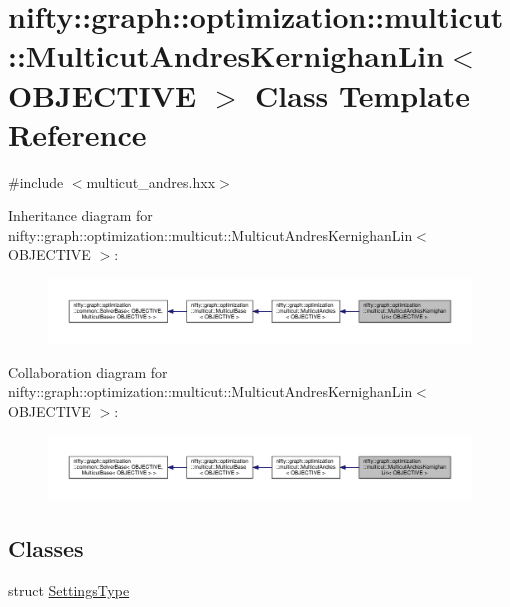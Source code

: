 \hypertarget{classnifty_1_1graph_1_1optimization_1_1multicut_1_1MulticutAndresKernighanLin}{}\section{nifty\+:\+:graph\+:\+:optimization\+:\+:multicut\+:\+:Multicut\+Andres\+Kernighan\+Lin$<$ O\+B\+J\+E\+C\+T\+I\+V\+E $>$ Class Template Reference}
\label{classnifty_1_1graph_1_1optimization_1_1multicut_1_1MulticutAndresKernighanLin}


{\ttfamily \#include $<$multicut\+\_\+andres.\+hxx$>$}



Inheritance diagram for nifty\+:\+:graph\+:\+:optimization\+:\+:multicut\+:\+:Multicut\+Andres\+Kernighan\+Lin$<$ O\+B\+J\+E\+C\+T\+I\+V\+E $>$\+:\nopagebreak
\begin{figure}[H]
\begin{center}
\leavevmode
\includegraphics[width=350pt]{classnifty_1_1graph_1_1optimization_1_1multicut_1_1MulticutAndresKernighanLin__inherit__graph}
\end{center}
\end{figure}


Collaboration diagram for nifty\+:\+:graph\+:\+:optimization\+:\+:multicut\+:\+:Multicut\+Andres\+Kernighan\+Lin$<$ O\+B\+J\+E\+C\+T\+I\+V\+E $>$\+:\nopagebreak
\begin{figure}[H]
\begin{center}
\leavevmode
\includegraphics[width=350pt]{classnifty_1_1graph_1_1optimization_1_1multicut_1_1MulticutAndresKernighanLin__coll__graph}
\end{center}
\end{figure}
\subsection*{Classes}
\begin{DoxyCompactItemize}
\item 
struct \hyperlink{structnifty_1_1graph_1_1optimization_1_1multicut_1_1MulticutAndresKernighanLin_1_1SettingsType}{Settings\+Type}
\end{DoxyCompactItemize}
